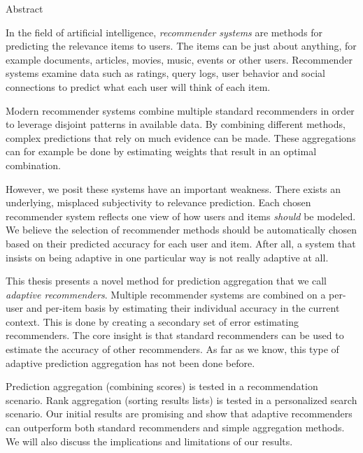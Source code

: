 \null\vspace{4em}
{
  \centering
  \normalfont
  \huge
  \noindent
  Abstract\\
}
\vspace{2em}

\noindent
In the field of artificial intelligence,
\emph{recommender systems} are methods
for predicting the relevance items to users.
The items can be just about anything, for example 
documents, articles, movies, music, events or other users.
Recommender systems examine data such as ratings, query logs,
user behavior and social connections to predict
what each user will think of each item.

Modern recommender systems
combine multiple standard recommenders
in order to leverage disjoint patterns in available data.
By combining different methods,
complex predictions that rely on much evidence can be made.
These aggregations can for example be done 
by estimating weights that result in an optimal combination.

However, we posit these systems have an important weakness.
There exists an underlying, misplaced subjectivity to relevance prediction.
Each chosen recommender system reflects one view of 
how users and items \emph{should} be modeled.
We believe the selection of recommender methods should 
be automatically chosen based on their predicted accuracy for each user and item.
After all, a system that insists on being adaptive
in one particular way is not really adaptive at all.

This thesis presents a novel method for prediction aggregation
that we call \emph{adaptive recommenders}.
Multiple recommender systems are combined on a per-user and per-item basis
by estimating their individual accuracy in the current context.
This is done by creating a secondary set of error estimating recommenders.
The core insight is that standard recommenders can be used
to estimate the accuracy of other recommenders.
As far as we know, this type of adaptive prediction aggregation
has not been done before.

Prediction aggregation (combining scores) is tested in a recommendation scenario.
Rank aggregation (sorting results lists) is tested in a personalized search scenario.
Our initial results are promising and show that adaptive recommenders
can outperform both standard recommenders and simple aggregation methods.
We will also discuss the implications and limitations of our results.

\cleardoublepage
